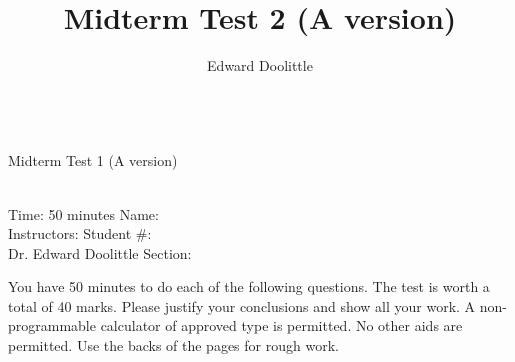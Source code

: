 \documentclass[12pt]{article}
\title{Midterm Test 2 (A version)}
\author{Edward Doolittle}
\begin{document}
\thispagestyle{plain}

\begin{center}
  \quad\\
  \LARGE{Midterm Test 1 (A version)}
\end{center}

\begin{flushleft}
\quad\\
Time: 50 minutes                \hfill       Name: \underline{\hspace{2in}}  \\
Instructors:                    \hfill Student \#: \underline{\hspace{2in}}  \\
\quad Dr. Edward Doolittle      \hfill    Section: \underline{\hspace{2in}}  \\
\end{flushleft}


\noindent
You have 50 minutes to do each of the following questions.
The test is worth a total of 40 marks.
Please justify your conclusions and
show all your work.
A non-programmable calculator of approved type is permitted.  No other aids
are permitted.
Use the backs of the pages for rough work.
\end{document}
